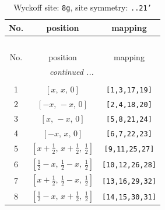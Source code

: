 \documentclass[fleqn,8pt]{jsarticle}
\begin{document}
\renewcommand{\arraystretch}{1.2}
\begin{longtable}{ccc}
\caption{Wyckoff site: {\tt 8g}, site symmetry: {\tt ..21'}}
 \\
 \hline \hline
No. & position & mapping \\ \hline \endfirsthead

\multicolumn{2}{l}{\tablename\ \thetable{}} \\
 \hline \hline
No. & position & mapping \\ \hline \endhead

 \hline \hline
\multicolumn{2}{r}{\footnotesize\it continued ...} \\ \endfoot

 \hline \hline
\multicolumn{2}{r}{} \\ \endlastfoot

1 & $\left[ x,\, x,\, 0 \right]$ & {\tt [1,3,17,19]} \\ \hline
2 & $\left[ - x,\, - x,\, 0 \right]$ & {\tt [2,4,18,20]} \\ \hline
3 & $\left[ x,\, - x,\, 0 \right]$ & {\tt [5,8,21,24]} \\ \hline
4 & $\left[ - x,\, x,\, 0 \right]$ & {\tt [6,7,22,23]} \\ \hline
5 & $\left[ x + \frac{1}{2},\, x + \frac{1}{2},\, \frac{1}{2} \right]$ & {\tt [9,11,25,27]} \\ \hline
6 & $\left[ \frac{1}{2} - x,\, \frac{1}{2} - x,\, \frac{1}{2} \right]$ & {\tt [10,12,26,28]} \\ \hline
7 & $\left[ x + \frac{1}{2},\, \frac{1}{2} - x,\, \frac{1}{2} \right]$ & {\tt [13,16,29,32]} \\ \hline
8 & $\left[ \frac{1}{2} - x,\, x + \frac{1}{2},\, \frac{1}{2} \right]$ & {\tt [14,15,30,31]} \\
\end{longtable}
\renewcommand{\arraystretch}{1.2}
\end{document}

